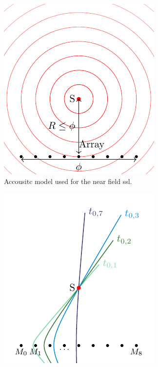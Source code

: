 \begin{figure}
  \centering
  \begin{subfigure}[b]{0.45\textwidth}
    \centering
    \includegraphics[width=\textwidth]{NearField.pdf}
    \caption{Accousitc model used for the near field \acrshort{ssl}.}
    \label{ssl:fig:near field}
  \end{subfigure}
  \hfill
  \begin{subfigure}[b]{0.45\textwidth}
    \centering
    \includegraphics[width=\textwidth]{hyperbola.pdf}

\end{subfigure}
\end{figure}
